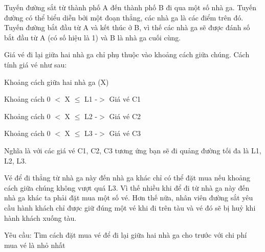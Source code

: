 Tuyến đường sắt từ thành phố A đến thành phố B đi qua một số nhà ga. Tuyến đường có thể biểu diễn bởi một đoạn thẳng, các nhà ga là các điểm trên đó. Tuyến đường bắt đầu từ A và kết thúc ở B, vì thế các nhà ga sẽ được đánh số bắt đầu từ A (có số hiệu là 1) và B là nhà ga cuối cùng.  

   Giá vé đi lại giữa hai nhà ga chỉ phụ thuộc vào khoảng cách giữa chúng. Cách tính giá vé như sau:  

   Khoảng cách giữa hai nhà ga (X)  

   Khoảng cách 0 $<$ X  $\le$  L1      -$>$ Giá vé              C1  

   Khoảng cách 0 $<$ X  $\le$  L2     -$>$ Giá vé              C2  

   Khoảng cách 0 $<$ X  $\le$  L3     -$>$ Giá vé              C3  

   Nghĩa là với các giá vé C1, C2, C3 tương ứng bạn sẽ đi quảng đường tối đa là L1, L2, L3.  

   Vé để đi thẳng từ nhà ga này đến nhà ga khác chỉ có thể đặt mua nếu khoảng cách giữa chúng không vượt quá L3. Vì thế nhiều khi để đi từ nhà ga này đến nhà ga khác ta phải đặt mua một số vé. Hơn thế nữa, nhân viên đường sắt yêu cầu hành khách chỉ được giữ đúng một vé khi đi trên tàu và vé đó sẽ bị huỷ khi hành khách xuống tàu.  

   Yêu cầu: Tìm cách đặt mua vé để đi lại giữa hai nhà ga cho trước với chi phí mua vé là nhỏ nhất